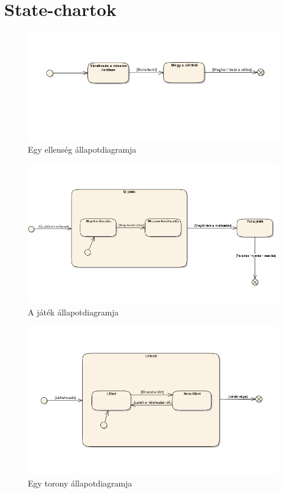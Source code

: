 \pagebreak
\section{State-chartok}

\begin{figure}[H]
\begin{center}
\includegraphics[width=15cm]{images/enemy_state.png}
\caption{Egy ellenség állapotdiagramja}
\label{fig:enemy_state}
\end{center}
\end{figure}

\begin{figure}[H]
\begin{center}
\includegraphics[width=15cm]{images/game_state.png}
\caption{A játék állapotdiagramja}
\label{fig:game_state}
\end{center}
\end{figure}

\begin{figure}[H]
\begin{center}
\includegraphics[width=15cm]{images/tower_state.png}
\caption{Egy torony állapotdiagramja}
\label{fig:tower_state}
\end{center}
\end{figure}
